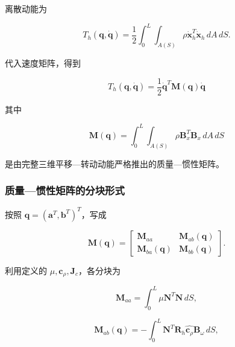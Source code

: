 离散动能为

\begin{equation}
\label{eq:galerkin-2-36}
T_{h}\left( \mathbf{q},\dot{\mathbf{q}} \right) = \frac{1}{2}\int_{0}^{L}{\int_{A(S)}^{}\rho}{\dot{\mathbf{x}}}_{h}^{T}{\dot{\mathbf{x}}}_{h}\, dA\, dS.
\end{equation}

代入速度矩阵，得到

\begin{equation}
\label{eq:galerkin-2-37}
\boxed{T_{h}\left( \mathbf{q},\dot{\mathbf{q}} \right) = \frac{1}{2}{\dot{\mathbf{q}}}^{T}\mathbf{M}\left( \mathbf{q} \right)\dot{\mathbf{q}}}
\end{equation}

其中

\begin{equation}
\label{eq:galerkin-2-38}
\boxed{\mathbf{M}\left( \mathbf{q} \right) = \int_{0}^{L}{\int_{A(S)}^{}\rho}\mathbf{B}_{x}^{T}\mathbf{B}_{x}\, dA\, dS}
\end{equation}

是由完整三维平移---转动动能严格推出的质量---惯性矩阵。

\subsubsection{质量---惯性矩阵的分块形式}\label{sec:galerkin-2-4-3}

按照 \(\mathbf{q} = \left( \mathbf{a}^{T},\mathbf{b}^{T} \right)^{T}\)，写成

\begin{equation}
\label{eq:galerkin-2-39}
\mathbf{M}\left( \mathbf{q} \right) = \begin{bmatrix}
\mathbf{M}_{aa} & \mathbf{M}_{ab}\left( \mathbf{q} \right) \\
\mathbf{M}_{ba}\left( \mathbf{q} \right) & \mathbf{M}_{bb}\left( \mathbf{q} \right)
\end{bmatrix}.
\end{equation}

利用定义的 \(\mu,\mathbf{c}_{\rho},\mathbf{J}_{c}\)，各分块为

\begin{equation}
\label{eq:galerkin-2-40}
\mathbf{M}_{aa} = \int_{0}^{L}\mu\mathbf{N}^{T}\mathbf{N}\, dS,
\end{equation}

\begin{equation}
\label{eq:galerkin-2-41}
\mathbf{M}_{ab}\left( \mathbf{q} \right) = - \int_{0}^{L}\mathbf{N}^{T}\mathbf{R}_{h}\widehat{\mathbf{c}_{\rho}}\mathbf{B}_{\omega}\, dS,
\end{equation}

